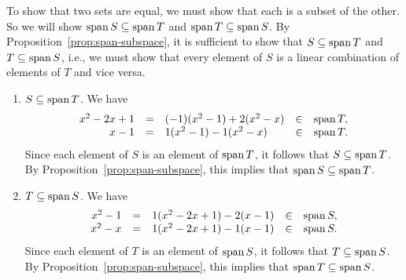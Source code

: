 \begin{solution}
  To show that two sets are equal, we must show that each is a subset
  of the other. So we will show $\sspan S \subseteq \sspan T$ and
  $\sspan T \subseteq \sspan S$. By
  Proposition~\ref{prop:span-subspace}, it is sufficient to show that
  $S\subseteq \sspan T$ and $T\subseteq \sspan S$, i.e., we must show
  that every element of $S$ is a linear combination of elements of $T$
  and vice versa.
  \begin{enumerate}
  \item $S \subseteq \sspan T$. We have
    \begin{equation*}
      \begin{array}{rclcl}
      x^2-2x+1 &=& (-1)(x^2-1) + 2(x^2-x) &\in& \sspan T, \\
      x-1 &=& 1(x^2-1) - 1(x^2-x) &\in& \sspan T.
      \end{array}
    \end{equation*}
    Since each element of $S$ is an element of $\sspan T$, it follows
    that $S\subseteq\sspan T$. By
    Proposition~\ref{prop:span-subspace}, this implies that
    $\sspan S\subseteq \sspan T$.
  \item $T \subseteq \sspan S$. We have
    \begin{equation*}
      \begin{array}{rclcl}
        x^2-1 &=& 1(x^2-2x+1) - 2(x-1) &\in& \sspan S, \\
        x^2-x &=& 1(x^2-2x+1) - 1(x-1) &\in& \sspan S.
      \end{array}
    \end{equation*}
    Since each element of $T$ is an element of $\sspan S$, it follows
    that $T\subseteq\sspan S$. By
    Proposition~\ref{prop:span-subspace}, this implies that
    $\sspan T\subseteq \sspan S$.
  \end{enumerate}
\end{solution}
